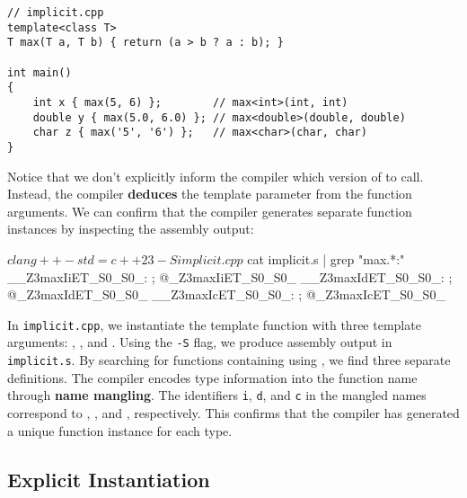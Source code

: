 \begin{lstlisting}[style=cxx]
// implicit.cpp
template<class T>
T max(T a, T b) { return (a > b ? a : b); }

int main()
{
    int x { max(5, 6) };        // max<int>(int, int)
    double y { max(5.0, 6.0) }; // max<double>(double, double)
    char z { max('5', '6') };   // max<char>(char, char)
}
\end{lstlisting}

\noindent
Notice that we don't explicitly inform the compiler which version of  to call.
Instead, the compiler \textbf{deduces} the template parameter  from the function arguments.
We can confirm that the compiler generates separate function instances by inspecting the assembly output:

\vspace{0.5em}
\begin{terminal}
$ clang++ -std=c++23 -S implicit.cpp
$ cat implicit.s | grep "max.*:"
__Z3maxIiET_S0_S0_:                     ; @_Z3maxIiET_S0_S0_
__Z3maxIdET_S0_S0_:                     ; @_Z3maxIdET_S0_S0_
__Z3maxIcET_S0_S0_:                     ; @_Z3maxIcET_S0_S0_
\end{terminal}

\begin{explanation}
In \texttt{implicit.cpp}, we instantiate the template function  with three template arguments: , , and .
Using the \texttt{-S} flag, we produce assembly output in \texttt{implicit.s}.
By searching for functions containing  using , we find three separate definitions.
The compiler encodes type information into the function name through \textbf{name mangling}.
The identifiers \texttt{i}, \texttt{d}, and \texttt{c} in the mangled names correspond to , , and , respectively.
This confirms that the compiler has generated a unique function instance for each type.
\end{explanation}

\subsection{Explicit Instantiation}


